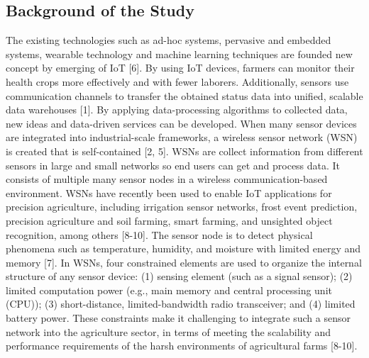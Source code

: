 \documentclass[12pt,a4paper]{report}
\begin{document}
\begin{List of Abbreviations}
\section{Background of the Study}
The existing technologies such as ad-hoc systems, pervasive and embedded systems, wearable technology and machine learning techniques are founded new concept by emerging of IoT [6]. By using IoT devices, farmers can monitor their health crops more effectively and with fewer laborers. Additionally, sensors use communication channels to transfer the obtained status data into unified, scalable data warehouses [1]. By applying data-processing algorithms to collected data, new ideas and data-driven services can be developed. When many sensor devices are integrated into industrial-scale frameworks, a wireless sensor network (WSN) is created that is self-contained [2, 5].  
 WSNs are collect information from different sensors in large and small networks so end users can get and process data. It consists of multiple many sensor nodes in a wireless communication-based environment. WSNs have recently been used to enable IoT applications for precision agriculture, including irrigation sensor networks, frost event prediction, precision agriculture and soil farming, smart farming, and unsighted object recognition, among others [8-10]. The sensor node is to detect physical phenomena such as temperature, humidity, and moisture with limited energy and memory [7]. In WSNs, four constrained elements are used to organize the internal structure of any sensor device: (1) sensing element (such as a signal sensor); (2) limited computation power (e.g., main memory and central processing unit (CPU)); (3) short-distance, limited-bandwidth radio transceiver; and (4) limited battery power. These constraints make it challenging to integrate such a sensor network into the agriculture sector, in terms of meeting the scalability and performance requirements of the harsh environments of agricultural farms [8-10].


\end{List of Abbreviations}
\end{document}
